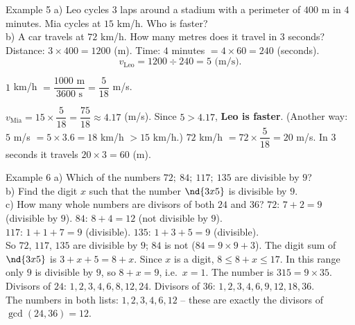 \begin{exbox}{Example 5}
a) Leo cycles $3$ laps around a stadium with a perimeter of $400$ m in $4$ minutes. Mia cycles at $15$ km/h. Who is faster?\\
b) A car travels at $72$ km/h. How many metres does it travel in $3$ seconds?
\guide
{}
Distance: $3 \times 400 = 1200$ (m). Time: $4$ minutes $= 4\times 60 = 240$ (seconds).
\[ v_{\text{Leo}} = 1200 \div 240 = 5 \text{ (m/s)}. \]
\begin{recallbox}$1$ km/h $= \dfrac{1000 \text{ m}}{3600 \text{ s}} = \dfrac{5}{18}$ m/s.\end{recallbox}
$v_{\text{Mia}} = 15 \times \dfrac{5}{18} = \dfrac{75}{18} \approx 4.17$ (m/s). Since $5 > 4.17$, \textbf{Leo is faster}.
(Another way: $5$ m/s $= 5\times 3.6 = 18$ km/h $> 15$ km/h.)
$72$ km/h $= 72 \times \dfrac{5}{18} = 20$ m/s. In $3$ seconds it travels $20 \times 3 = 60$ (m).
\end{exbox}

\begin{exbox}{Example 6}
a) Which of the numbers $72;\ 84;\ 117;\ 135$ are divisible by $9$?\\
b) Find the digit $x$ such that the number $\nd{3x5}$ is divisible by $9$.\\
c) How many whole numbers are divisors of both $24$ and $36$?
\guide
{}
$72$: $7+2 = 9$ (divisible by $9$). \quad $84$: $8 + 4 = 12$ (not divisible by $9$).\\
$117$: $1+1+7 = 9$ (divisible). \quad $135$: $1+3+5 = 9$ (divisible).\\
So $72$, $117$, $135$ are divisible by $9$; $84$ is not ($84 = 9\times 9 + 3$).
The digit sum of $\nd{3x5}$ is $3 + x + 5 = 8 + x$. Since $x$ is a digit, $8 \le 8 + x \le 17$. In this range only $9$ is
divisible by $9$, so $8 + x = 9$, i.e.\ $x = 1$. The number is $315 = 9 \times 35$.
Divisors of $24$: $1, 2, 3, 4, 6, 8, 12, 24$. Divisors of $36$: $1, 2, 3, 4, 6, 9, 12, 18, 36$.\\
The numbers in both lists: $1, 2, 3, 4, 6, 12$ -- these are exactly the divisors of $\gcd(24,36) = 12$.
\end{exbox}

